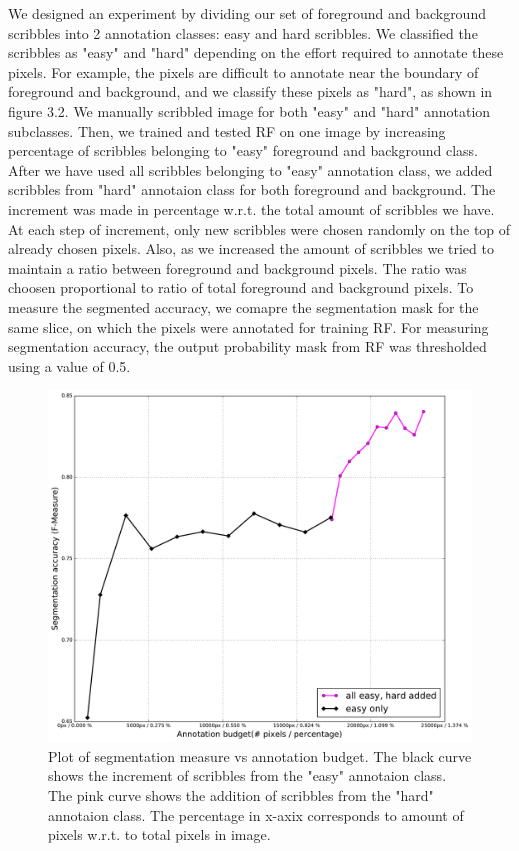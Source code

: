 We designed an experiment by dividing our set of foreground and background scribbles into 2 annotation classes: easy and hard scribbles. We classified the scribbles as "easy" and "hard" depending on the effort required to annotate these pixels. For example, the pixels are difficult to annotate near the boundary of foreground and background, and we classify these pixels as "hard", as shown in figure 3.2. We manually scribbled image for both "easy" and "hard" annotation subclasses. Then, we trained and tested RF on one image by increasing percentage of scribbles belonging to "easy" foreground and background class. After we have used all scribbles belonging to "easy" annotation class, we added scribbles from "hard" annotaion class for both foreground and background. The increment was made in percentage w.r.t. the total amount of scribbles we have. At each step of increment, only new scribbles were chosen randomly on the top of already chosen pixels. Also, as we increased the amount of scribbles we tried to maintain a ratio between foreground and background pixels. The ratio was choosen proportional to ratio of total foreground and background pixels. To measure the segmented accuracy, we comapre the segmentation mask for the same slice, on which the pixels were annotated for training RF. For measuring segmentation accuracy, the output probability mask from RF was thresholded using a value of 0.5.

\begin{figure}[h!] \label{fig:easy_hard}
\centering
 \includegraphics[width=0.73\linewidth]{figures/rf_easy_hard.pdf}
\caption{Plot of segmentation measure vs annotation budget. The black curve shows the increment of scribbles from the "easy" annotaion class. The pink curve shows the addition of scribbles from the "hard" annotaion class. The percentage in x-axix corresponds to amount of pixels w.r.t. to total pixels in image.}
\end{figure}

